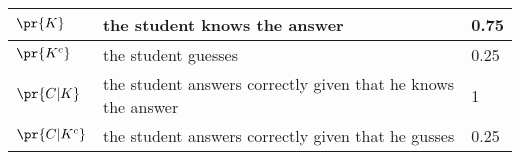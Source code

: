 \begin{tabular}{|l|l|l|} \hline
$\pr{K}$& the student knows the answer &0.75\\ \hline
$\pr{K^c}$& the student guesses &0.25\\ \hline
$\pr{C|K}$& the student answers correctly given that he knows the answer &1\\ \hline
$\pr{C|K^c}$& the student answers correctly given that he gusses &0.25\\ \hline
\end{tabular}\\\\
